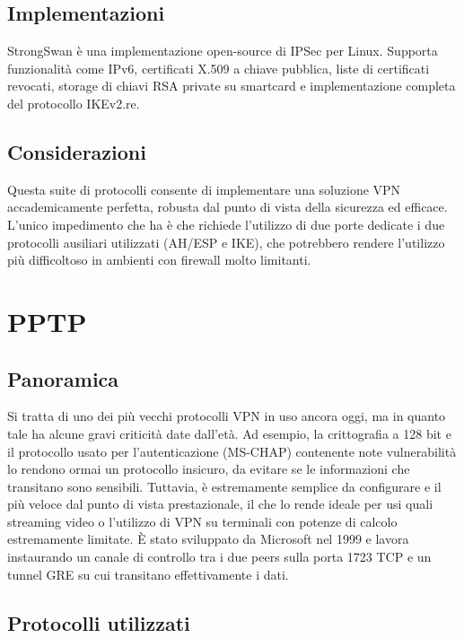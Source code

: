\subsection{Implementazioni}
StrongSwan è una implementazione open-source di IPSec per Linux. Supporta funzionalità come IPv6, certificati X.509 a chiave pubblica, liste di certificati revocati, storage di chiavi RSA private su smartcard e implementazione completa del protocollo IKEv2.re.

\subsection{Considerazioni}
Questa suite di protocolli consente di implementare una soluzione VPN accademicamente perfetta, robusta dal punto di vista della sicurezza ed efficace. L'unico impedimento che ha è che richiede l'utilizzo di due porte dedicate i due protocolli ausiliari utilizzati (AH/ESP e IKE), che potrebbero rendere l'utilizzo più difficoltoso in ambienti con firewall molto limitanti.

\section{PPTP}
\subsection{Panoramica}
Si tratta di uno dei più vecchi protocolli VPN in uso ancora oggi, ma in quanto tale ha alcune gravi criticità date dall'età. Ad esempio, la crittografia a 128 bit e il protocollo usato per l'autenticazione (MS-CHAP) contenente note vulnerabilità lo rendono ormai un protocollo insicuro, da evitare se le informazioni che transitano sono sensibili.
Tuttavia, è estremamente semplice da configurare e il più veloce dal punto di vista prestazionale, il che lo rende ideale per usi quali streaming video o l'utilizzo di VPN su terminali con potenze di calcolo estremamente limitate.
È stato sviluppato da Microsoft nel 1999 \cite[RFC2637]{RFC2637} e lavora instaurando un canale di controllo tra i due peers sulla porta 1723 TCP e un tunnel GRE su cui transitano effettivamente i dati.

\subsection{Protocolli utilizzati}

